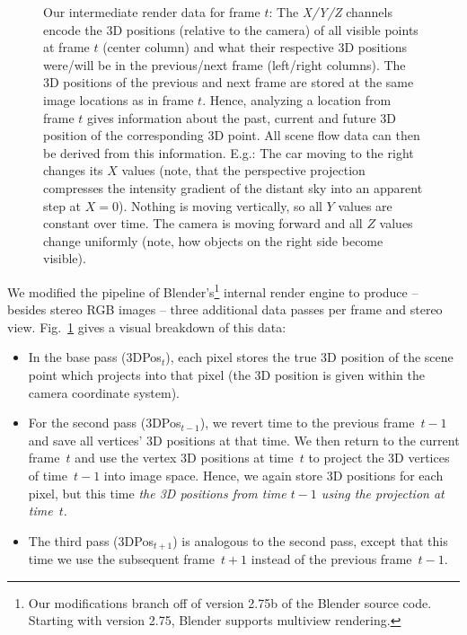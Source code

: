 \documentclass[10pt,twocolumn,letterpaper]{article}
\begin{document}
\begin{figure}[t]
\begin{center}
{\begin{tabular}{cccc}
    \end{tabular}%
  }%
  \end{center}%
  \caption{Our intermediate render data for frame $t$:
           The \emph{X/Y/Z} channels encode the 3D positions (relative to the camera) of all visible points at frame $t$ (center column) and what their respective 3D positions were/will be in the previous/next frame (left/right columns).
           The 3D positions of the previous and next frame are stored at the same image locations as in frame $t$. Hence, analyzing a location from frame $t$ gives information about the past, current and future 3D position of the corresponding 3D point. All scene flow data can then be derived from this information.
           E.g.: The car moving to the right changes its $X$ values (note, that the perspective projection compresses the intensity gradient of the distant sky into an apparent step at $X=0$).
           Nothing is moving vertically, so all $Y$ values are constant over time.
           The camera is moving forward and all $Z$ values change uniformly (note, how objects on the right side become visible). 
          }%
  \label{fig:pos3d-images}
\end{figure}


We modified the pipeline of Blender's\footnote{Our modifications branch off of version 2.75b of the Blender source code. Starting with version 2.75, Blender supports multiview rendering.} internal render engine to produce -- besides stereo RGB images -- three additional data passes per frame and stereo view.
Fig.~\ref{fig:pos3d-images} gives a visual breakdown of this data:
\begin{itemize}%
  \item In the base pass (3DPos$_t$), each pixel stores the true 3D position of the scene point which projects into that pixel (the 3D position is given within the camera coordinate system).

  \item For the second pass (3DPos$_{t-1}$), we revert time to the previous frame~$t\!-\!1$ and save all vertices' 3D positions at that time.
    We then return to the current frame~$t$ and use the vertex 3D positions at time~$t$ to project the 3D vertices of time~$t-1$ into image space. 
    Hence, we again store 3D positions for each pixel, but this time \emph{the 3D positions from time $t\!-\!1$ using the projection at time~$t$}.
  \item The third pass (3DPos$_{t+1}$) is analogous to the second pass, except that this time we use the subsequent frame~$t\!+\!1$ instead of the previous frame~$t\!-\!1$.
\end{itemize}%
\end{document}

